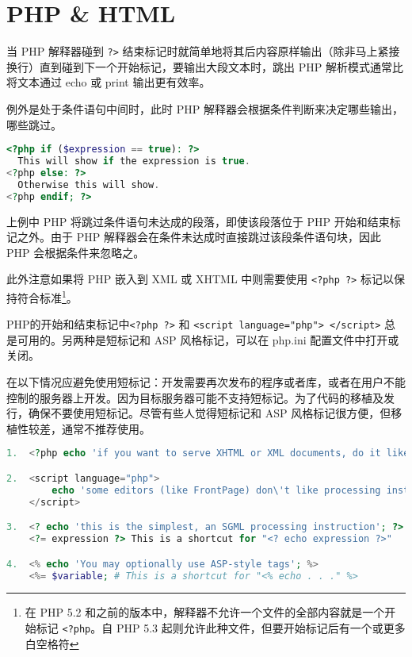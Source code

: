 \section{PHP \& HTML}

当 PHP 解释器碰到 \texttt{?>} 结束标记时就简单地将其后内容原样输出（除非马上紧接换行）直到碰到下一个开始标记，要输出大段文本时，跳出 PHP 解析模式通常比将文本通过 echo 或 print 输出更有效率。

例外是处于条件语句中间时，此时 PHP 解释器会根据条件判断来决定哪些输出，哪些跳过。

\begin{lstlisting}[language=PHP]
<?php if ($expression == true): ?>
  This will show if the expression is true.
<?php else: ?>
  Otherwise this will show.
<?php endif; ?>
\end{lstlisting}

上例中 PHP 将跳过条件语句未达成的段落，即使该段落位于 PHP 开始和结束标记之外。由于 PHP 解释器会在条件未达成时直接跳过该段条件语句块，因此 PHP 会根据条件来忽略之。

此外注意如果将 PHP 嵌入到 XML 或 XHTML 中则需要使用 \texttt{<?php ?>} 标记以保持符合标准\footnote{在 PHP 5.2 和之前的版本中，解释器不允许一个文件的全部内容就是一个开始标记 \texttt{<?php}。自 PHP 5.3 起则允许此种文件，但要开始标记后有一个或更多白空格符}。

PHP的开始和结束标记中\texttt{<?php ?>} 和 \texttt{<script language="php"> </script>} 总是可用的。另两种是短标记和 ASP 风格标记，可以在 php.ini 配置文件中打开或关闭。

在以下情况应避免使用短标记：开发需要再次发布的程序或者库，或者在用户不能控制的服务器上开发。因为目标服务器可能不支持短标记。为了代码的移植及发行，确保不要使用短标记。尽管有些人觉得短标记和 ASP 风格标记很方便，但移植性较差，通常不推荐使用。

\begin{lstlisting}[language=PHP]
1.  <?php echo 'if you want to serve XHTML or XML documents, do it like this'; ?>

2.  <script language="php">
        echo 'some editors (like FrontPage) don\'t like processing instructions';
    </script>

3.  <? echo 'this is the simplest, an SGML processing instruction'; ?>
    <?= expression ?> This is a shortcut for "<? echo expression ?>"

4.  <% echo 'You may optionally use ASP-style tags'; %>
    <%= $variable; # This is a shortcut for "<% echo . . ." %>
\end{lstlisting}

